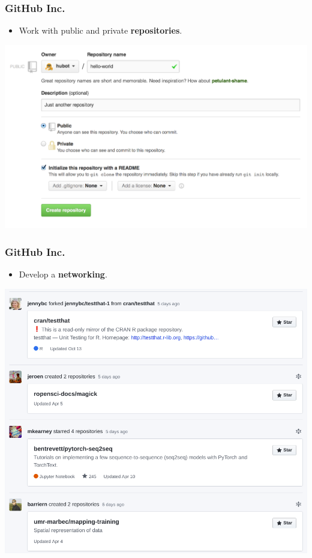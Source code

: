 \documentclass[svgnames]{beamer}
\begin{document}
\begin{frame}
\frametitle{GitHub Inc.}
  \begin{itemize}
  \item Work with public and private \textbf{repositories}. 
  \end{itemize}

\begin{center}
\includegraphics[scale=0.2]{img/githubRepo_features.png}
\end{center}  

\end{frame}


\begin{frame}
\frametitle{GitHub Inc.}
\begin{itemize}
  \item Develop a \textbf{networking}.
\end{itemize}

\begin{center}
\includegraphics[scale=0.30]{img/githubRepo_networking.png}
\end{center}  

\end{frame}
\end{document}
